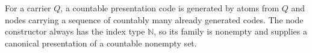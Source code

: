 \begin{definition}
For a carrier $Q$, a countable presentation code is generated by atoms
from $Q$ and nodes carrying a sequence of countably many already generated
codes.  The node constructor always has the index type $\mathbb N$, so its
family is nonempty and supplies a canonical presentation of a countable
nonempty set.
\end{definition}
